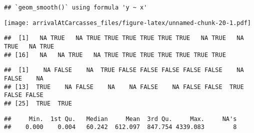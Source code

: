 \documentclass[
]{article}
\newenvironment{Shaded}{\begin{snugshade}}{\end{snugshade}}
\newcommand{\CommentTok}[1]{\textcolor[rgb]{0.56,0.35,0.01}{\textit{#1}}}
\newcommand{\FunctionTok}[1]{\textcolor[rgb]{0.00,0.00,0.00}{#1}}
\newcommand{\NormalTok}[1]{#1}
\newcommand{\SpecialCharTok}[1]{\textcolor[rgb]{0.00,0.00,0.00}{#1}}
\begin{document}
\begin{verbatim}
## `geom_smooth()` using formula 'y ~ x'
\end{verbatim}

\texttt{[image: arrivalAtCarcasses\_files/figure-latex/unnamed-chunk-20-1.pdf]}

\begin{Shaded}
\end{Shaded}

\begin{verbatim}
##  [1]   NA TRUE   NA TRUE TRUE TRUE TRUE TRUE TRUE   NA TRUE   NA TRUE   NA TRUE
## [16]   NA   NA TRUE   NA TRUE TRUE TRUE TRUE TRUE TRUE TRUE
\end{verbatim}

\begin{Shaded}
\end{Shaded}

\begin{verbatim}
##  [1]    NA FALSE    NA  TRUE FALSE FALSE FALSE FALSE FALSE    NA FALSE    NA
## [13]  TRUE    NA FALSE    NA    NA FALSE    NA FALSE FALSE  TRUE FALSE FALSE
## [25]  TRUE  TRUE
\end{verbatim}

\begin{Shaded}
\end{Shaded}

\begin{verbatim}
##     Min.  1st Qu.   Median     Mean  3rd Qu.     Max.     NA's 
##    0.000    0.004   60.242  612.097  847.754 4339.083        8
\end{verbatim}
\end{document}
